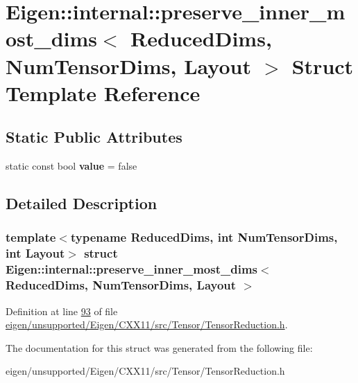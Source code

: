 \hypertarget{struct_eigen_1_1internal_1_1preserve__inner__most__dims}{}\section{Eigen\+:\+:internal\+:\+:preserve\+\_\+inner\+\_\+most\+\_\+dims$<$ Reduced\+Dims, Num\+Tensor\+Dims, Layout $>$ Struct Template Reference}
\label{struct_eigen_1_1internal_1_1preserve__inner__most__dims}
\subsection*{Static Public Attributes}
\begin{DoxyCompactItemize}
\item 
\mbox{\label{struct_eigen_1_1internal_1_1preserve__inner__most__dims_a371aeeff19468544bc8283d82d82146e}} 
static const bool {\bfseries value} = false
\end{DoxyCompactItemize}


\subsection{Detailed Description}
\subsubsection*{template$<$typename Reduced\+Dims, int Num\+Tensor\+Dims, int Layout$>$\newline
struct Eigen\+::internal\+::preserve\+\_\+inner\+\_\+most\+\_\+dims$<$ Reduced\+Dims, Num\+Tensor\+Dims, Layout $>$}



Definition at line \hyperlink{eigen_2unsupported_2_eigen_2_c_x_x11_2src_2_tensor_2_tensor_reduction_8h_source_l00093}{93} of file \hyperlink{eigen_2unsupported_2_eigen_2_c_x_x11_2src_2_tensor_2_tensor_reduction_8h_source}{eigen/unsupported/\+Eigen/\+C\+X\+X11/src/\+Tensor/\+Tensor\+Reduction.\+h}.



The documentation for this struct was generated from the following file\+:\begin{DoxyCompactItemize}
\item 
eigen/unsupported/\+Eigen/\+C\+X\+X11/src/\+Tensor/\+Tensor\+Reduction.\+h\end{DoxyCompactItemize}
